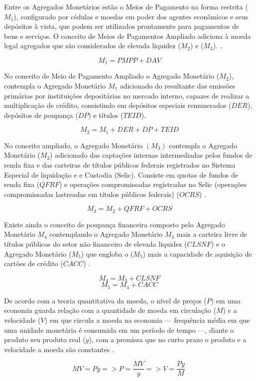 \documentclass[12pt,openright,oneside,a4paper,chapter=TITLE,section=TITLE,subsection=TITLE,english,french,spanish,portugues,sumario=tradicional]{abntex2}
\begin{document}
Entre os Agregados Monetários estão o Meios de Pagamento na forma restrita (\(M_1\)), configurado por cédulas e moedas em poder dos agentes econômicos e seus depósitos à vista, que podem ser utilizados prontamente para pagamentos de bens e serviços. O conceito de Meios de Pagamentos Ampliado adiciona à moeda legal agregados que são considerados de elevada liquidez (\(M_2\)) e (\(M_3\)). \cite{bcb:2019}.

\[
M_1 = PMPP + DAV
\]

No conceito de Meio de Pagamento Ampliado o Agregado Monetário (\(M_2\)), contempla o Agregado Monetário \(M_1\) adicionado do resultante das emissões primárias por instituições depositárias no mercado interno, capazes de realizar a multiplicação de crédito, consistindo em depósitos especiais remunerados (\(DER\)), depósitos de poupança (\(DP\)) e títulos (\(TEID\)).

\[
M_2 = M_1 + DER + DP + TEID
\]

No conceito ampliado, o Agregado Monetário \((M_3)\) contempla o Agregado Monetário (\(M_2\)) adicionado das captações internas intermediadas pelos fundos de renda fixa e das carteiras de títulos públicos federais registrados no Sistema Especial de liquidação e e Custodia (Selic). Consiste em quotas de fundos de renda fixa (\(QFRF\)) e operações compromissadas registradas no Selic (operações compromissadas lastreadas em títulos públicos federais) (\(OCRS\)) \cite{bcb:2019}.

\[
M_3 = M_2 + QFRF + OCRS
\]

Existe ainda o conceito de poupança financeira composto pelo Agregado Monetário \(M_4\) contemplando o Agregado Monetário \(M_3\) mais a carteira livre de títulos públicos do setor não financeiro de elevada liquidez (\(CLSNF\)) \cite{bcb:2019} e o Agregado Monetário (\(M_5\)) que engloba o (\(M_5\)) mais a capacidade de aquisição de cartões de crédito (\(CACC\)) .

\[
M_4 = M_3 + CLSNF
\]
\[
M_5 = M_4 + CACC
\]

De acordo com a teoria quantitativa da moeda, o nível de preços (\(P\)) em uma economia guarda relação com a quantidade de moeda em circulação (\(M\)) e a velocidade (\(V\)) em que circula a moeda na economia --- frequência média em que uma unidade monetária é consumida em um período de tempo ---, diante o produto seu produto real (\(y\)), com a premissa que no curto prazo o produto e a velocidade a moeda são constantes \cite{vasconcellos:2011}.

\[
MV = Py => P = \frac{MV}{y} => V = \frac{Py}{M}\
\]
\end{document}
